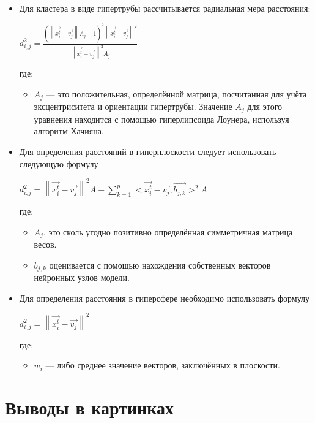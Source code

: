\documentclass[unicode, 12pt, a4paper,oneside,fleqn]{article}
\begin{document}
\begin{itemize}
\item Для кластера в виде гипертрубы рассчитывается радиальная мера
  расстояния:

  $d^2_{i,j} = \frac
  {(\left\|\vec{x^t_i}-\vec{v_j}\right\|A_j - 1)^2 \left\|\vec{x^t_i}-\vec{v_j}\right\|^2}
  {\left\|\vec{x^t_i}-\vec{v_j}\right\|^2A_j}$
  
  где: \begin{itemize}
  \item $A_j$ — это положительная, определённой матрица, посчитанная
    для учёта эксцентриситета и ориентации гипертрубы. Значение $A_j$ для
    этого уравнения находится с помощью гиперлипсоида Лоунера, используя
    алгоритм Хачияна.
  \end{itemize}

\item Для определения расстояний в гиперплоскости следует использовать
  следующую формулу

  $d^2_{i,j} = 
  \left\|\vec{x^t_i}-\vec{v_j}\right\|^2A -
  \sum_{k=1}^{p} {<\vec{x^t_i}-\vec{v_j}, \vec{b_{j,k}}>^2A}$

  
  где: \begin{itemize}
  \item $A_j$, это сколь угодно позитивно определённая симметричная
    матрица весов. 
  \item $b_{j, k}$ оценивается с помощью нахождения собственных
    векторов нейронных узлов модели.
    \end{itemize}

  \item Для определения расстояния в гиперсфере необходимо
    использовать формулу
    
    $d^2_{i,j} = \left\|\vec{x^t_i}-\vec{v_j}\right\|^2$
    
    где: \begin{itemize}
    \item $w_i$ — либо среднее значение векторов, заключённых в
      плоскости. 
    \end{itemize}
\end{itemize}


\section{Выводы в картинках}
\end{document}
